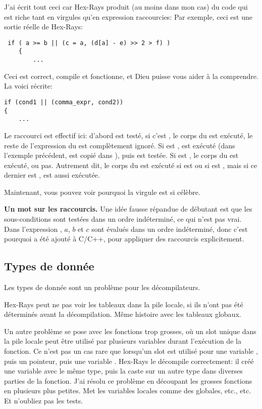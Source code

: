 J'ai écrit tout ceci car Hex-Rays produit (au moins dans mon cas) du code qui est
riche tant en virgules qu'en expression raccourcies:
Par exemple, ceci est une sortie réelle de Hex-Rays:

\begin{lstlisting}
 if ( a >= b || (c = a, (d[a] - e) >> 2 > f) )
    {
    	...
\end{lstlisting}

Ceci est correct, compile et fonctionne, et Dieu puisse vous aider à la comprendre.
La voici récrite:

\begin{lstlisting}
if (cond1 || (comma_expr, cond2))
{
	...
\end{lstlisting}

Le raccourci est effectif ici: d'abord  est testé, si c'est ,
le corps du  est exécuté, le reste de l'expression du  est complètement
ignoré.
Si  est ,  est exécuté (dans l'exemple précédent,
 est copié dans ), puis  est testée.
Si  est , le corps du  est exécuté, ou pas.
Autrement dit, le corps du  est exécuté si  est  ou si  est ,
mais si ce dernier est ,  est aussi exécutée.

Maintenant, vous pouvez voir pourquoi la virgule est si célèbre.

\textbf{Un mot sur les raccourcis.}
Une idée fausse répandue de débutant est que les sous-conditions sont testées dans
un ordre indéterminé, ce qui n'est pas vrai.
Dans l'expression ,  $a$, $b$ et $c$ sont évalués dans un ordre indéterminé,
donc c'est pourquoi \TT{||} a été ajouté à C/C++, pour appliquer des raccourcis explicitement.

\subsection{Types de donnée}

Les types de donnée sont un problème pour les décompilateurs.

Hex-Rays peut ne pas voir les tableaux dans la pile locale, si ils n'ont pas été déterminés
avant la décompilation. Même histoire avec les tableaux globaux.

Un autre problème se pose avec les fonctions trop grosses, où un slot unique dans
la pile locale peut être utilisé par plusieurs variables durant l'exécution de la
fonction.
Ce n'est pas un cas rare que lorsqu'un slot est utilisé pour une variable ,
puis un pointeur, puis une variable .
Hex-Rays le décompile correctement: il créé une variable avec le même type, puis
la caste sur un autre type dans diverses parties de la fonction.
J'ai résolu ce problème en découpant les grosses fonctions en plusieurs plus petites.
Met les variables locales comme des globales, etc., etc.
Et n'oubliez pas les tests.

